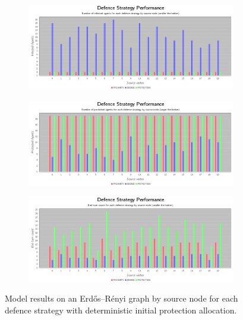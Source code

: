 \documentclass[results.tex]{subfiles}
\begin{document}
\begin{figure}[!ht]
\centering
     \begin{subfigure}[b]{0.9\textwidth}
         \centering
         \includegraphics[width=\textwidth]{ErdosRenyi/Deterministic/DeterministicInfectedChart}
         \label{fig:er-det-infected}
     \end{subfigure}
     \vfill
     \begin{subfigure}[b]{0.9\textwidth}
         \centering
         \includegraphics[width=\textwidth]{ErdosRenyi/Deterministic/DeterministicProtectedChart}
         \label{fig:er-det-protected}
     \end{subfigure}
     \vfill
     \begin{subfigure}[b]{0.9\textwidth}
         \centering
         \includegraphics[width=\textwidth]{ErdosRenyi/Deterministic/DeterministicEndTurnChart}
         \label{fig:er-det-end}
     \end{subfigure}
        \caption{Model results on an Erdős–Rényi graph by source node for each defence strategy with deterministic initial protection allocation.}
        \label{fig:er-det-charts}
\end{figure}
\end{document}
